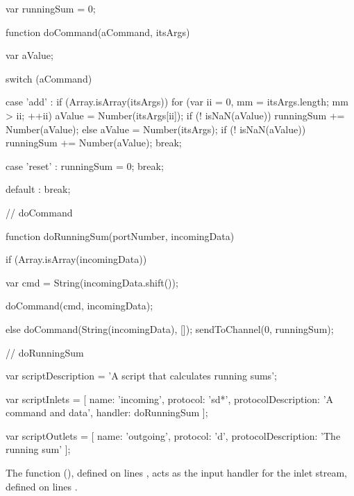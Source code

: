 \begin{listing}[5]{1}
var runningSum = 0;

function doCommand(aCommand, itsArgs)
{
    var aValue;
    
    switch (aCommand)
    {
        case 'add' :
            if (Array.isArray(itsArgs))
            {
                for (var ii = 0, mm = itsArgs.length; mm > ii; ++ii)
                {
                    aValue = Number(itsArgs[ii]);
                    if (! isNaN(aValue))
                    {
                        runningSum += Number(aValue);
                    }
                }
            }
            else
            {
                aValue = Number(itsArgs);
                if (! isNaN(aValue))
                {
                    runningSum += Number(aValue);
                }
            }
            break;
            
        case 'reset' :
            runningSum = 0;
            break;
            
        default :
            break;
            
    }
} // doCommand

function doRunningSum(portNumber, incomingData)
{
    if (Array.isArray(incomingData))
    {
        var cmd = String(incomingData.shift());
        
        doCommand(cmd, incomingData);
    }
    else
    {
        doCommand(String(incomingData), []);
    }
    sendToChannel(0, runningSum);
} // doRunningSum

var scriptDescription = 'A script that calculates running sums';

var scriptInlets = [ { name: 'incoming', protocol: 'sd*',
                        protocolDescription: 'A command and data',
                        handler: doRunningSum } ];

var scriptOutlets = [ { name: 'outgoing', protocol: 'd',
                        protocolDescription: 'The running sum' } ];
\end{listing}
\codeEnd{}
The function (), defined on lines \longDash{},
acts as the input handler for the inlet stream, defined on lines
\longDash{}.\\

